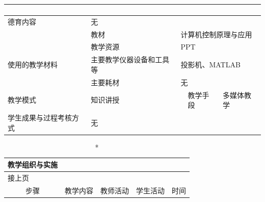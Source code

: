 {\begin{longtable}{|m{20mm}|m{20mm}|m{20mm}|m{20mm}|m{20mm}|m{28mm}|}
{\begin{enumerate}
\end{enumerate}}\\
\hline
\centering 德育内容 &\multicolumn{5}{m{108mm}|}{无}\\
\hline
 &教材 & \multicolumn{4}{m{88mm}|}{计算机控制原理与应用}\\
\cline{2-6}& 教学资源 &\multicolumn{4}{m{88mm}|}{PPT}\\
\cline{2-6}\centering 使用的教学材料& 主要教学仪器设备和工具等 &\multicolumn{4}{m{88mm}|}{投影机、MATLAB}\\
\cline{2-6}& 主要耗材 &\multicolumn{4}{m{88mm}|}{无}\\
\hline
\centering 教学模式 &\multicolumn{2}{m{40mm}|}{知识讲授}&\centering 教学手段 &\multicolumn{2}{m{48mm}|}{多媒体教学}\\
\hline
\centering 学生成果与过程考核方式 &\multicolumn{5}{m{108mm}|}{无}
\end{longtable}
\clearpage

\begin{landscape}

\begin{longtable}{|m{10mm}|m{50mm}|m{50mm}|m{50mm}|m{15mm}|}
\caption*{\huge 教学组织与实施}\\
\hline
\endfirsthead
\multicolumn{5}{l}{\small 接上页}\\
\hline
\multicolumn{1}{|c|}{步骤}&\multicolumn{1}{c|}{教学内容}&\multicolumn{1}{c|}{教师活动}&\multicolumn{1}{c|}{学生活动}&\multicolumn{1}{c|}{时间}\\
\hline
\endhead


\end{longtable}
\end{landscape}}
